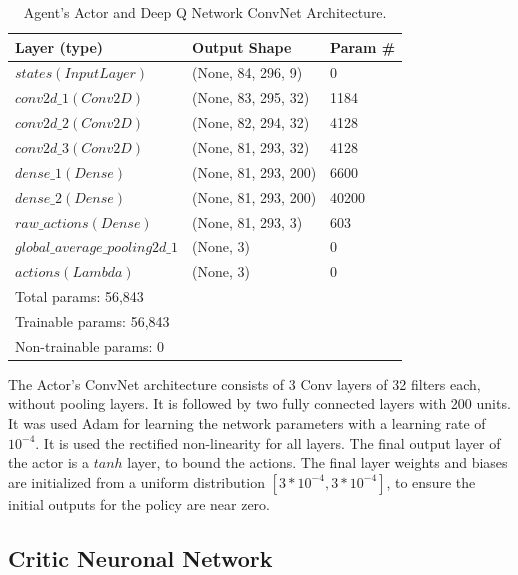 \documentclass[peerreview,onecolumn]{IEEEtran}
\begin{document}
	 \begin{table}[h] 
	\centering
	\begin{tabular}{l l l} 
		\toprule 
		Layer (type) & Output Shape & Param \# \\ 		
		\midrule
		$states (InputLayer)$ & (None, 84, 296, 9) & 0\\ 
		$conv2d\_1 (Conv2D)$ & (None, 83, 295, 32) & 1184  \\ 
		$conv2d\_2 (Conv2D)$ & (None, 82, 294, 32) & 4128  \\
		$conv2d\_3 (Conv2D)$ & (None, 81, 293, 32) & 4128  \\
		$dense\_1 (Dense)$  & (None, 81, 293, 200) & 6600  \\   
		$dense\_2 (Dense)$ & (None, 81, 293, 200)  & 40200 \\
		$raw\_actions (Dense)$ & (None, 81, 293, 3) & 603  \\
		$global\_average\_pooling2d\_1$ & (None, 3) & 0  \\
		$actions (Lambda)$ & (None, 3) &  0 \\
		\midrule 
		\midrule
		Total params: 56,843 & &  \\
		Trainable params: 56,843 & &  \\
		Non-trainable params: 0 & & \\

		\bottomrule 
	\end{tabular}
	\smallskip 
	\caption{Agent's Actor and Deep Q Network ConvNet Architecture.} 
	\label{tab:actor_arch} 
\end{table}

The Actor's ConvNet architecture consists of 3 Conv layers of 32 filters each, without pooling layers. It is followed by two fully connected layers with 200 units. It was used Adam \cite{adam_2014} for learning the network parameters with a learning rate of $10^{-4}$. It is used the rectified non-linearity \cite{relu_2011} for all layers. The final output layer of the actor is a $tanh$ layer, to bound the actions. The final layer weights and biases are initialized from a uniform distribution $[3 * 10^{-4}, 3 * 10^{-4}]$, to ensure the initial outputs for the policy are near zero.
	 
	 \subsection{Critic Neuronal Network}
	 
\end{document}
